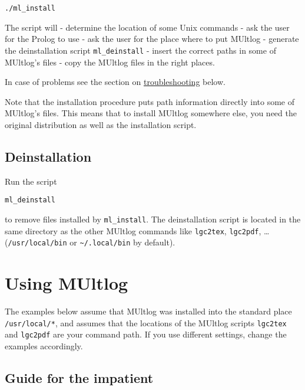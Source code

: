 \documentclass[]{article}
\begin{document}
\begin{verbatim}
./ml_install
\end{verbatim}

The script will - determine the location of some Unix commands - ask the
user for the Prolog to use - ask the user for the place where to put
MUltlog - generate the deinstallation script \texttt{ml\_deinstall} -
insert the correct paths in some of MUltlog's files - copy the MUltlog
files in the right places.

In case of problems see the section on
\protect\hyperlink{troubleshooting}{troubleshooting} below.

Note that the installation procedure puts path information directly into
some of MUltlog's files. This means that to install MUltlog somewhere
else, you need the original distribution as well as the installation
script.

\hypertarget{deinstallation}{%
\subsection{Deinstallation}\label{deinstallation}}

Run the script

\begin{verbatim}
ml_deinstall
\end{verbatim}

to remove files installed by \texttt{ml\_install}. The deinstallation
script is located in the same directory as the other MUltlog commands
like \texttt{lgc2tex}, \texttt{lgc2pdf}, \ldots{}
(\texttt{/usr/local/bin} or \texttt{\textasciitilde{}/.local/bin} by
default).

\hypertarget{using-multlog}{%
\section{Using MUltlog}\label{using-multlog}}

The examples below assume that MUltlog was installed into the standard
place \texttt{/usr/local/*}, and assumes that the locations of the
MUltlog scripts \texttt{lgc2tex} and \texttt{lgc2pdf} are your command
path. If you use different settings, change the examples accordingly.

\hypertarget{guide-for-the-impatient}{%
\subsection{Guide for the impatient}\label{guide-for-the-impatient}}
\end{document}
